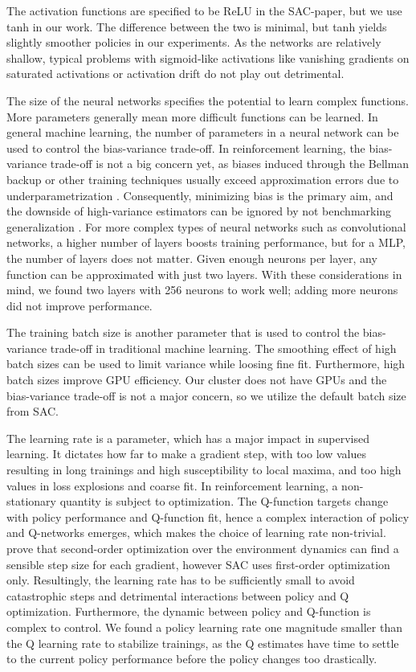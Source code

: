The activation functions are specified to be ReLU in the \ac{SAC}-paper, but we use tanh in our work. The difference between the two is minimal, but tanh yields slightly smoother policies in our experiments. As the networks are relatively shallow, typical problems with sigmoid-like activations like vanishing gradients on saturated activations or activation drift do not play out detrimental.

The size of the neural networks specifies the potential to learn complex functions. More parameters generally mean more difficult functions can be learned. In general machine learning, the number of parameters in a neural network can be used to control the bias-variance trade-off. In reinforcement learning, the bias-variance trade-off is not a big concern yet, as biases induced through the Bellman backup or other training techniques usually exceed approximation errors due to underparametrization \cite{fujimotoAddressingFunctionApproximation2018}. Consequently, minimizing bias is the primary aim, and the downside of high-variance estimators can be ignored by not benchmarking generalization \cite{cobbeQuantifyingGeneralizationReinforcement2019}. For more complex types of neural networks such as convolutional networks, a higher number of layers boosts training performance, but for a \ac{MLP}, the number of layers does not matter. Given enough neurons per layer, any function can be approximated with just two layers. With these considerations in mind, we found two layers with 256 neurons to work well; adding more neurons did not improve performance.

The training batch size is another parameter that is used to control the bias-variance trade-off in traditional machine learning. The smoothing effect of high batch sizes can be used to limit variance while loosing fine fit. Furthermore, high batch sizes improve GPU efficiency. Our cluster does not have GPUs and the bias-variance trade-off is not a major concern, so we utilize the default batch size from \ac{SAC}.

The learning rate is a parameter, which has a major impact in supervised learning. It dictates how far to make a gradient step, with too low values resulting in long trainings and high susceptibility to local maxima, and too high values in loss explosions and coarse fit. In reinforcement learning, a non-stationary quantity is subject to optimization. The Q-function targets change with policy performance and Q-function fit, hence a complex interaction of policy and Q-networks emerges, which makes the choice of learning rate non-trivial. \citet{kakadeNaturalPolicyGradient2001} prove that second-order optimization over the environment dynamics can find a sensible step size for each gradient, however \ac{SAC} uses first-order optimization only. Resultingly, the learning rate has to be sufficiently small to avoid catastrophic steps and detrimental interactions between policy and Q optimization. Furthermore, the dynamic between policy and Q-function is complex to control. We found a policy learning rate one magnitude smaller than the Q learning rate to stabilize trainings, as the Q estimates have time to settle to the current policy performance before the policy changes too drastically.

